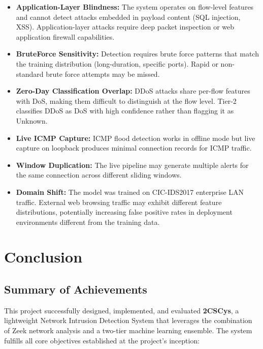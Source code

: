 \documentclass[12pt,a4paper,twoside]{report}
\begin{document}
\begin{itemize}
    \item \textbf{Application-Layer Blindness:} The system operates on flow-level features and cannot detect attacks embedded in payload content (SQL injection, XSS). Application-layer attacks require deep packet inspection or web application firewall capabilities.
    \item \textbf{BruteForce Sensitivity:} Detection requires brute force patterns that match the training distribution (long-duration, specific ports). Rapid or non-standard brute force attempts may be missed.
    \item \textbf{Zero-Day Classification Overlap:} DDoS attacks share per-flow features with DoS, making them difficult to distinguish at the flow level. Tier-2 classifies DDoS as DoS with high confidence rather than flagging it as Unknown.
    \item \textbf{Live ICMP Capture:} ICMP flood detection works in offline mode but live capture on loopback produces minimal connection records for ICMP traffic.
    \item \textbf{Window Duplication:} The live pipeline may generate multiple alerts for the same connection across different sliding windows.
    \item \textbf{Domain Shift:} The model was trained on CIC-IDS2017 enterprise LAN traffic. External web browsing traffic may exhibit different feature distributions, potentially increasing false positive rates in deployment environments different from the training data.
\end{itemize}

\chapter{Conclusion}

\section{Summary of Achievements}

This project successfully designed, implemented, and evaluated \textbf{2CSCys}, a lightweight Network Intrusion Detection System that leverages the combination of Zeek network analysis and a two-tier machine learning ensemble. The system fulfills all core objectives established at the project's inception:
\end{document}
